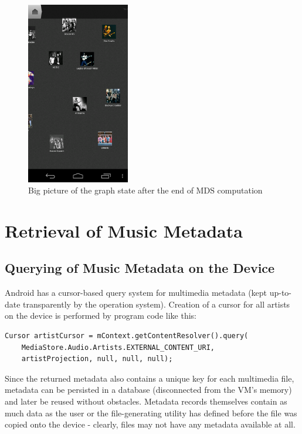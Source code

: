 \begin{figure}[H]
  \centering
    \includegraphics[width=0.4\textwidth]{figures/screen_mds_11_final_big_picture}
  \caption{Big picture of the graph state after the end of MDS computation}
\end{figure}

\section{Retrieval of Music Metadata}

\subsection{Querying of Music Metadata on the Device}

Android has a cursor-based query system for multimedia metadata (kept up-to-date transparently by the
operation system). Creation of a cursor for all artists on the device is performed by program code like this:

\begin{verbatim}
Cursor artistCursor = mContext.getContentResolver().query(
	MediaStore.Audio.Artists.EXTERNAL_CONTENT_URI,
    artistProjection, null, null, null);
\end{verbatim}

Since the returned metadata also contains a unique key for each multimedia file, metadata can be
persisted in a database (disconnected from the VM's memory) and later be reused without obstacles.
Metadata records themselves contain as much data as the user or the file-generating utility has defined
before the file was copied onto the device - clearly, files may not have any metadata available at all.

